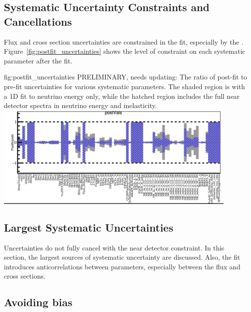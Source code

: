\subsection{Systematic Uncertainty Constraints and Cancellations}

Flux and cross section uncertainties are constrained in the fit, especially by the . Figure~\ref{fig:postfit_uncertainties} shows the level of constraint on each systematic parameter after the fit.

\begin{dunefigure}{fig:postfit_uncertainties}
{PRELIMINARY, needs updating: The ratio of post-fit to pre-fit uncertainties for various systematic parameters. The shaded region is with a 1D  fit to neutrino energy only, while the hatched region includes the full \twod near detector spectra in neutrino energy and inelasticity.}
  \includegraphics[width=0.9\textwidth]{graphics/postfit_errors.png}
\end{dunefigure}



\subsection{Largest Systematic Uncertainties}

Uncertainties do not fully cancel with the near detector constraint. In this section, the largest sources of systematic uncertainty are discussed. Also, the fit introduces anticorrelations between parameters, especially between the flux and cross sections.


\subsection{Avoiding bias}

